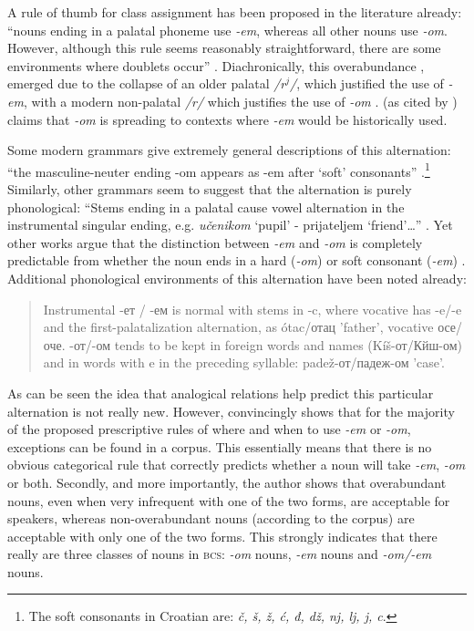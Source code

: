 A rule of thumb for class assignment has been proposed in the literature already: ``nouns ending in a palatal phoneme use \textit{-em}, whereas all other nouns use \textit{-om}. However, although this rule seems reasonably straightforward, there are some environments where doublets occur'' \autocite[377]{Lecic.2015}. Diachronically, this overabundance \autocites{Thornton.2011, Thornton.2010a}, emerged due to the collapse of an older palatal \textit{/r$^j$/}, which justified the use of \textit{-em}, with a modern non-palatal \textit{/r/} which justifies the use of \textit{-om} \autocite{Lecic.2015}. \textcite{Mladenovic.1977} (as cited by \citealt{Lecic.2015}) claims that \textit{-om} is spreading to contexts where \textit{-em} would be historically used.

Some modern grammars give extremely general descriptions of this alternation: ``the masculine-neuter ending -om appears as -em after `soft' consonants'' \autocite[85]{Alexander.2006}.\footnote{The soft consonants in Croatian are: \textit{č, š, ž, ć, đ, dž, nj, lj, j, c}.} Similarly, other grammars seem to suggest that the alternation is purely phonological: ``Stems ending in a palatal cause vowel alternation in the instrumental singular ending, e.g. \textit{učenik\emph{o}m} `pupil' - prijateljem `friend'\dots'' \autocite[12]{Kordic.1997}. Yet other works argue that the distinction between \textit{-em} and \textit{-om} is completely predictable from whether the noun ends in a hard (\textit{-om}) or soft consonant (\textit{-em}) \autocite[146]{Hammond.2005}. Additional phonological environments of this alternation have been noted already:

\begin{quotation}
Instrumental -ет / -ем is normal with stems in -c, where vocative has -e/-e and the first-palatalization alternation, as ótac/отац 'father', vocative осе/оче. -от/-ом tends to be kept in foreign words and names (Kíš-от/Кйш-ом) and in words with e in the preceding syllable: padež-от/падеж-ом 'case'. \autocite[320]{Brown.1993}
\end{quotation}

As can be seen the idea that analogical relations help predict this particular alternation is not really new. However,  \textcite{Lecic.2015} convincingly shows that for the majority of the proposed prescriptive rules of where and when to use \textit{-em} or \textit{-om}, exceptions can be found in a corpus. This essentially means that there is no obvious categorical rule that correctly predicts whether a noun will take \textit{-em}, \textit{-om} or both. Secondly, and more importantly, the author shows that overabundant nouns, even when very infrequent with one of the two forms, are acceptable for speakers, whereas non-overabundant nouns (according to the corpus) are acceptable with only one of the two forms. This strongly indicates that there really are three classes of nouns in \textsc{bcs}: \textit{-om} nouns, \textit{-em} nouns and \textit{-om/-em} nouns.

